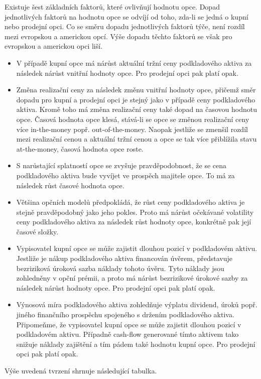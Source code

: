 \documentclass[a4paper]{book}
\begin{document}
Existuje šest základních faktorů, které ovlivňují hodnotu opce. Dopad jednotlivých faktorů na hodnotu opce se odvíjí od toho, zda-li se jedná o kupní nebo prodejní opci. Co se směru dopadu jednotlivých faktorů týče, není rozdíl mezi evropskou a americkou opcí. Výše dopadu těchto faktorů se však pro evropskou a americkou opci liší.
\begin{itemize}
\item V případě kupní opce má nárůst aktuální tržní ceny podkladového aktiva za následek nárůst vnitřní hodnoty opce. Pro prodejní opci pak platí opak.
\item Změna realizační ceny za následek změnu vnitřní hodnoty opce, přičemž směr dopadu pro kupní a prodejní opci je stejný jako v případě ceny podkladového aktiva. Kromě toho má změna realizační ceny také dopad na časovou hodnotu opce. Časová hodnota opce klesá, stává-li se opce se změnou realizační ceny více in-the-money popř. out-of-the-money. Naopak jestliže se zmenšil rozdíl mezi realizační cenou a aktuální tržní cenou a opce se tak více přiblížila stavu at-the-money, časová hodnota opce roste.
\item S narůstající splatností opce se zvyšuje pravděpodobnost, že se cena podkladového aktiva bude vyvíjet ve prospěch majitele opce. To má za následek růst časové hodnota opce.
\item Většina opčních modelů předpokládá, že růst ceny podkladového aktiva je stejně pravděpodobný jako jeho pokles. Proto má nárůst očekávané volatility ceny podkladového aktiva za následek růst hodnoty opce, konkrétně pak její časové složky.
\item Vypisovatel kupní opce se může zajistit dlouhou pozicí v podkladovém aktivu. Jestliže je nákup podkladového aktiva financován úvěrem, představuje bezriziková úroková sazba náklady tohoto úvěru. Tyto náklady jsou zohledněny v opční prémii, a proto má nárůst bezrizikové úrokové sazby za následek nárůst hodnoty opce. Pro prodejní opci pak platí opak. 
\item Výnosová míra podkladového aktiva zohledňuje výplatu dividend, úroků popř. jiného finančního prospěchu spojeného s držením podkladového aktiva. Připomeňme, že vypisovatel kupní opce se může zajistit dlouhou pozicí v podkladovém aktivu. Případně cash-flow generované tímto aktivem tako snižuje náklady zajištění a tím pádem také hodnotu kupní opce. Pro prodejní opci pak platí opak.
\end{itemize}
Výše uvedená tvrzení shrnuje následující tabulka.
\end{document}
